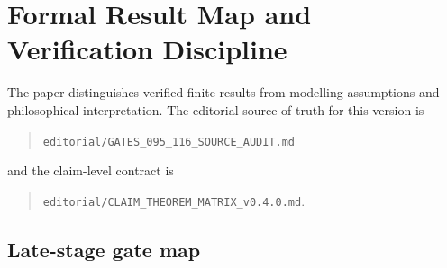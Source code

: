 \appendix
\section{Formal Result Map and Verification Discipline}

The paper distinguishes verified finite results from modelling assumptions and philosophical interpretation. The editorial source of truth for this version is
\begin{quote}
\texttt{editorial/GATES\_095\_116\_SOURCE\_AUDIT.md}
\end{quote}
and the claim-level contract is
\begin{quote}
\texttt{editorial/CLAIM\_THEOREM\_MATRIX\_v0.4.0.md}.
\end{quote}

\subsection{Late-stage gate map}


